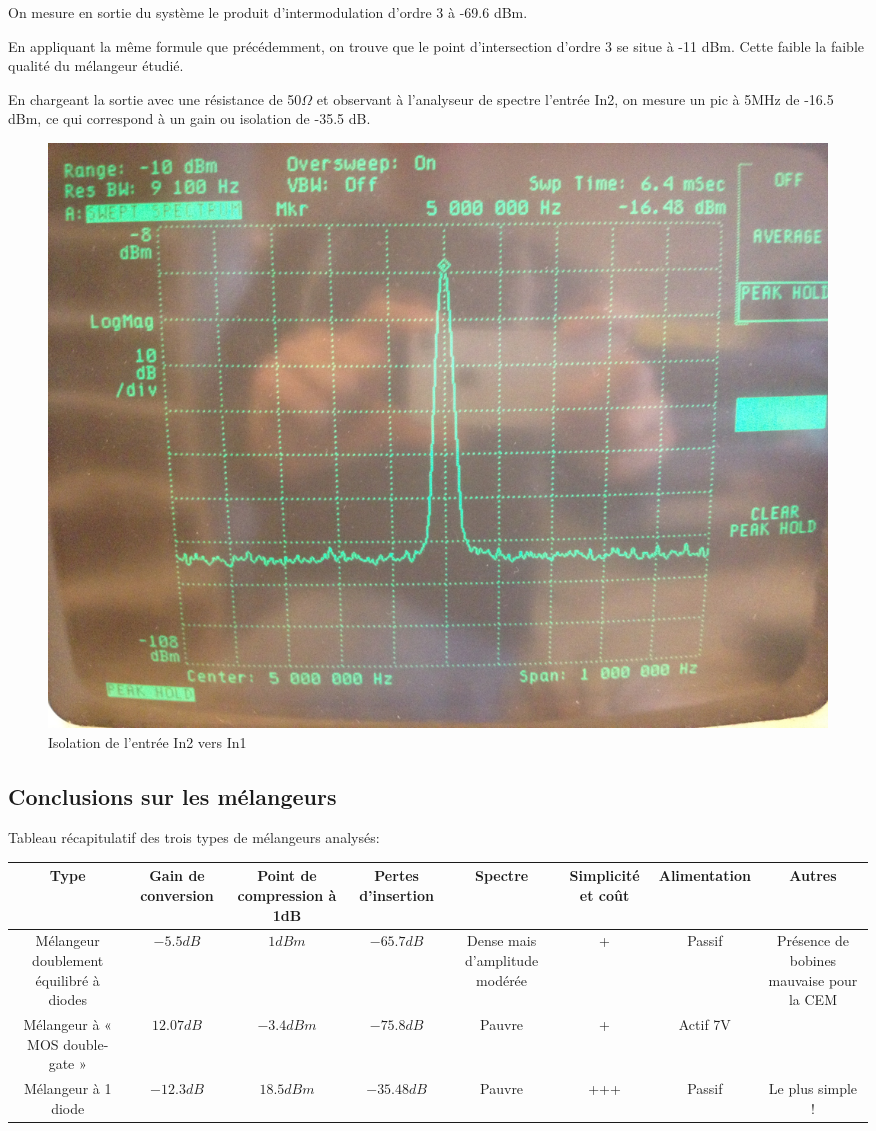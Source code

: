 \documentclass{article}
\begin{document}
On mesure en sortie du système le produit d'intermodulation d'ordre 3 à -69.6 dBm.

En appliquant la même formule que précédemment, on trouve que le point d'intersection d'ordre 3 se situe à -11 dBm. Cette faible la faible qualité du mélangeur étudié.



En chargeant la sortie avec une résistance de 50$\Omega$ et observant à l'analyseur de spectre l'entrée In2, on mesure un pic à 5MHz de -16.5 dBm, ce qui correspond à un gain ou isolation de -35.5 dB.

\begin{figure}[h!]
	\centering
	\includegraphics[width=.7\textwidth]{11_3_5}
	\caption{Isolation de l'entrée In2 vers In1}
	\label{fig:11_3_5}
\end{figure}




\subsection{Conclusions sur les mélangeurs}


Tableau récapitulatif des trois types de mélangeurs analysés:

\begin{tabular}{|c|c|c|c|c|c|c|c|}
\hline Type & Gain de conversion& Point de compression à 1dB & Pertes d'insertion& Spectre& Simplicité et coût& Alimentation& Autres \\
\hline Mélangeur doublement équilibré à diodes & $-5.5dB$ & $1dBm$  & $-65.7dB$ & Dense mais d'amplitude modérée & + & Passif& Présence de bobines mauvaise pour la CEM \\ 
\hline Mélangeur à « MOS double-gate » & $12.07dB$ & $-3.4dBm$ & $-75.8dB$ & Pauvre & + & Actif 7V&   \\ 
\hline Mélangeur à 1 diode & $-12.3dB$ & $18.5dBm$ & $-35.48dB$ & Pauvre & +++ & Passif& Le plus simple ! \\ 
\hline 
\end{tabular} 
\end{document}
